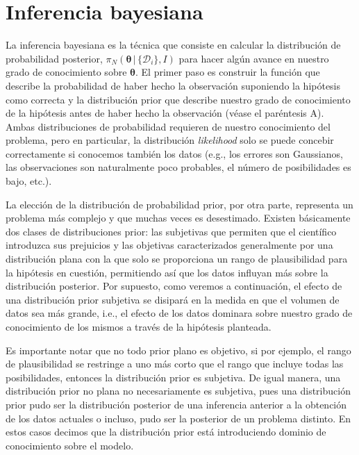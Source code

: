 \documentclass[a4paper,twoside]{article}
\newcommand{\br}{\ensuremath{\,|\,}\xspace}
\newcommand{\hip}{\ensuremath{\mathbold{\theta}}\xspace}
\newcommand{\dat}{\ensuremath{\{\mathcal{D}_i\}}\xspace}
\newcommand{\pos}[2]{\ensuremath{\pi_N\left(#1\br #2\right)}\xspace}
\begin{document}

\section{Inferencia bayesiana}
%
La inferencia bayesiana es la técnica que consiste en calcular la distribución de probabilidad
posterior, \(\pos{\hip}{\dat,I}\) para hacer algún avance en nuestro grado de conocimiento sobre
\(\hip\). El primer paso es construir la función que describe la probabilidad de haber hecho la
observación suponiendo la hipótesis como correcta y la distribución prior que describe nuestro grado
de conocimiento de la hipótesis antes de haber hecho la observación (véase el paréntesis A). Ambas
distribuciones de probabilidad requieren de nuestro conocimiento del problema, pero en particular,
la distribución \emph{likelihood} solo se puede concebir correctamente si conocemos también los
datos (e.g., los errores son Gaussianos, las observaciones son naturalmente poco probables, el
número de posibilidades es bajo, etc.).

La elección de la distribución de probabilidad prior, por otra parte, representa un problema más
complejo y que muchas veces es desestimado. Existen básicamente dos clases de distribuciones prior:
las subjetivas que permiten que el científico introduzca sus prejuicios y las objetivas
caracterizados generalmente por una distribución plana con la que solo se proporciona un rango de
plausibilidad para la hipótesis en cuestión, permitiendo así que los datos influyan más sobre la
distribución posterior. Por supuesto, como veremos a continuación, el efecto de una distribución
prior subjetiva se disipará en la medida en que el volumen de datos sea más grande, i.e., el efecto
de los datos dominara sobre nuestro grado de conocimiento de los mismos a través de la hipótesis
planteada.

Es importante notar que no todo prior plano es objetivo, si por ejemplo, el rango de plausibilidad
se restringe a uno más corto que el rango que incluye todas las posibilidades, entonces la
distribución prior es subjetiva. De igual manera, una distribución prior no plana no necesariamente
es subjetiva, pues una distribución prior pudo ser la distribución posterior de una inferencia
anterior a la obtención de los datos actuales o incluso, pudo ser la posterior de un problema
distinto. En estos casos decimos que la distribución prior está introduciendo dominio de
conocimiento sobre el modelo.
\end{document}

